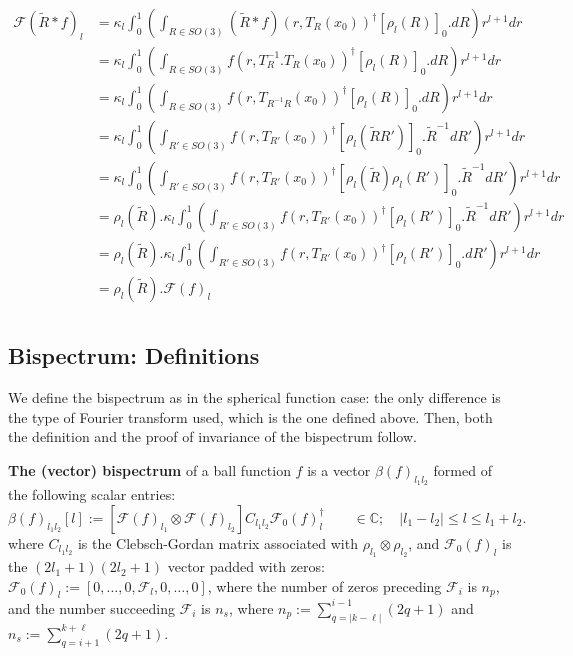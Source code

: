 \documentclass{article}
\begin{document}
\begin{align*}
    \mathcal{F}(\tilde{R} \ast f)_{l}
    &=\kappa_l \int_0^1 \left(\int_{R \in SO(3)} (\tilde{R} \ast f)(r, T_R(x_0))^\dagger [\rho_l(R)]_0. dR\right) r^{l+1} dr\\
    &=\kappa_l \int_0^1 \left(\int_{R \in SO(3)} f(r, T_R^{-1}.T_R(x_0))^\dagger [\rho_l(R)]_0. dR\right) r^{l+1} dr\\
    &=\kappa_l \int_0^1 \left(\int_{R \in SO(3)} f(r, T_{R^{-1}R}(x_0))^\dagger [\rho_l(R)]_0. dR\right) r^{l+1} dr\\
    &=\kappa_l \int_0^1 \left(\int_{R' \in SO(3)} f(r, T_{R'}(x_0))^\dagger [\rho_l(\tilde{R}R')]_0. \tilde{R}^{-1}dR'\right) r^{l+1} dr\\
    &=\kappa_l \int_0^1 \left(\int_{R' \in SO(3)} f(r, T_{R'}(x_0))^\dagger [\rho_l(\tilde{R})\rho_l(R')]_0. \tilde{R}^{-1}dR'\right) r^{l+1} dr\\
    &=\rho_l(\tilde{R}) . \kappa_l \int_0^1 \left(\int_{R' \in SO(3)} f(r, T_{R'}(x_0))^\dagger [\rho_l(R')]_0. \tilde{R}^{-1}dR'\right) r^{l+1} dr\\
    &=\rho_l(\tilde{R}) . \kappa_l \int_0^1 \left(\int_{R' \in SO(3)} f(r, T_{R'}(x_0))^\dagger [\rho_l(R')]_0. dR'\right) r^{l+1} dr\\
    &=\rho_l(\tilde{R}) . \mathcal{F}(f)_{l} \\
\end{align*}


\subsection{Bispectrum: Definitions}

We define the bispectrum as in the spherical function case: the only difference is the type of Fourier transform used, which is the one defined above. Then, both the definition and the proof of invariance of the bispectrum follow.

\textbf{The (vector) bispectrum} of a ball function $f$ is a vector $\beta(f)_{l_1l_2}$ formed of the following scalar entries:
\begin{equation}
    \beta(f)_{l_1l_2}[l]
    :=
    \left[
    \mathcal{F}(f)_{l_1} \otimes \mathcal{F}(f)_{l_2}
    \right]
    C_{l_1l_2} \mathcal{F}_0(f)_l^{\dagger}
    \qquad \in \mathbb{C}; \quad|l_1-l_2| \leq l \leq l_1+l_2.
\end{equation}
where $C_{l_1l_2}$ is the Clebsch-Gordan matrix associated with $\rho_{l_1} \otimes \rho_{l_2}$, and $\mathcal{F}_0(f)_l$ is the $(2l_1+1)(2l_2+1)$ vector padded with zeros: $\mathcal{F}_0(f)_l:=\left[0, \ldots, 0, \mathcal{F}_l, 0, \ldots, 0\right]$, where the number of zeros preceding $\mathcal{F}_i$ is $n_p$, and the number succeeding $\mathcal{F}_i$ is $n_s$, where $n_p:=\sum_{q=|k-\ell|}^{i-1}(2 q+1)$ and $n_s:=\sum_{q=i+1}^{k+\ell}(2 q+1)$.
\end{document}
